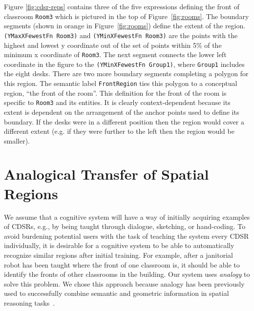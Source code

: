 \documentclass[letterpaper]{article}
\newcommand{\fw}[1]{\texttt{#1}}
\begin{document}
Figure \ref{fig:cdsr-reps} contains three of the five expressions defining the front of classroom \fw{Room3} which is pictured in the top of Figure~\ref{fig:rooms}. The boundary segments (shown in orange in Figure~\ref{fig:rooms}) define the extent of the region. \fw{(YMaxXFewestFn Room3)} and \fw{(YMinXFewestFn Room3)} are the points with the highest and lowest y coordinate out of the set of points within 5\% of the minimum x coordinate of \fw{Room3}. The next segment connects the lower left coordinate in the figure to the \fw{(YMinXFewestFn Group1)}, where \fw{Group1} includes the eight desks. There are two more boundary segments completing a polygon for this region. The semantic label \fw{FrontRegion} ties this polygon to a conceptual region, ``the front of the room''. This definition for the front of the room is specific to \fw{Room3} and its entities. It is clearly context-dependent because its extent is dependent on the arrangement of the anchor points used to define its boundary. If the desks were in a different position then the region would cover a different extent (e.g. if they were further to the left then the region would be smaller). 



\section{Analogical Transfer of Spatial Regions}\label{sec:analogy}


We assume that a cognitive system will have a way of initially acquiring examples of CDSRs, e.g., by being taught through dialogue, sketching, or hand-coding. To avoid burdening potential users with the task of teaching the system every CDSR individually, it is desirable for a cognitive system to be able to automatically recognize similar regions after initial training. For example, after a janitorial robot has been taught where the front of one classroom is, it should be able to identify the fronts of other classrooms in the building. Our system uses \emph{analogy} to solve this problem. We chose this approach because analogy has been previously used to successfully combine semantic and geometric information in spatial reasoning tasks~\cite{Lockwood/etal2008}.
\end{document}
